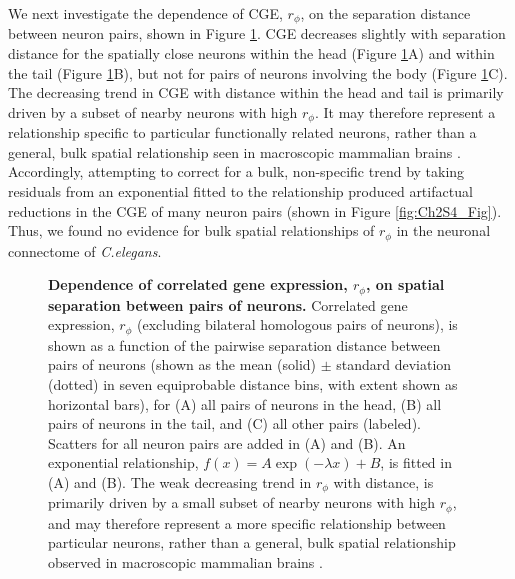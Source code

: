 We next investigate the dependence of CGE, $r_\phi$, on the separation distance between neuron pairs, shown in Figure \ref{fig:Ch2Fig4}.
CGE decreases slightly with separation distance for the spatially close neurons within the head (Figure \ref{fig:Ch2Fig4}A) and within the tail (Figure \ref{fig:Ch2Fig4}B), but not for pairs of neurons involving the body (Figure \ref{fig:Ch2Fig4}C).
The decreasing trend in CGE with distance within the head and tail is primarily driven by a subset of nearby neurons with high $r_\phi$.
It may therefore represent a relationship specific to particular functionally related neurons, rather than a general, bulk spatial relationship seen in macroscopic mammalian brains \citep{Fulcher2016}.
Accordingly, attempting to correct for a bulk, non-specific trend by taking residuals from an exponential fitted to the relationship produced artifactual reductions in the CGE of many neuron pairs (shown in Figure \ref{fig:Ch2S4_Fig}).
Thus, we found no evidence for bulk spatial relationships of $r_\phi$ in the neuronal connectome of \emph{C.elegans}.

\begin{figure}[h]
  \caption{
  \textbf{Dependence of correlated gene expression, $r_\phi$, on spatial separation between pairs of neurons.}
  Correlated gene expression, $r_\phi$ (excluding bilateral homologous pairs of neurons), is shown as a function of the pairwise separation distance between pairs of neurons (shown as the mean (solid) $\pm$ standard deviation (dotted) in seven equiprobable distance bins, with extent shown as horizontal bars), for (A) all pairs of neurons in the head, (B) all pairs of neurons in the tail, and (C) all other pairs (labeled).
  Scatters for all neuron pairs are added in (A) and (B).
  An exponential relationship, $f(x) = A\exp(-\lambda x) + B$, is fitted in (A) and (B).
  The weak decreasing trend in $r_\phi$ with distance, is primarily driven by a small subset of nearby neurons with high $r_\phi$, and may therefore represent a more specific relationship between particular neurons, rather than a general, bulk spatial relationship observed in macroscopic mammalian brains \citep{Fulcher2016, Krienen2016}.}
\label{fig:Ch2Fig4}
\end{figure}

